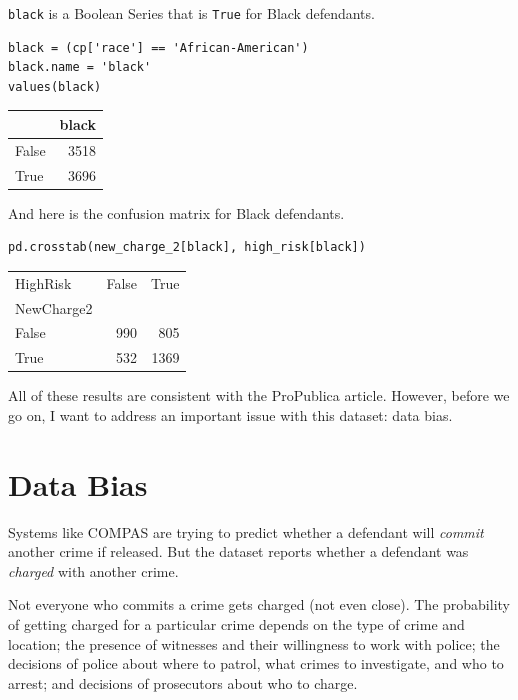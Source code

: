 \passthrough{\lstinline!black!} is a Boolean Series that is
\passthrough{\lstinline!True!} for Black defendants.

\begin{lstlisting}[]
black = (cp['race'] == 'African-American')
black.name = 'black'
values(black)
\end{lstlisting}

\begin{tabular}{lr}
\midrule
{} &  black \\
\midrule
False &   3518 \\
True  &   3696 \\
\midrule
\end{tabular}

And here is the confusion matrix for Black defendants.

\begin{lstlisting}[]
pd.crosstab(new_charge_2[black], high_risk[black])
\end{lstlisting}

\begin{tabular}{lrr}
\midrule
HighRisk &  False &  True \\
NewCharge2 &        &       \\
\midrule
False      &    990 &   805 \\
True       &    532 &  1369 \\
\midrule
\end{tabular}

All of these results are consistent with the ProPublica article.
However, before we go on, I want to address an important issue with this
dataset: data bias.

\hypertarget{data-bias}{%
\section{Data Bias}\label{data-bias}}

Systems like COMPAS are trying to predict whether a defendant will
\emph{commit} another crime if released. But the dataset reports whether
a defendant was \emph{charged} with another crime.

Not everyone who commits a crime gets charged (not even close). The
probability of getting charged for a particular crime depends on the
type of crime and location; the presence of witnesses and their
willingness to work with police; the decisions of police about where to
patrol, what crimes to investigate, and who to arrest; and decisions of
prosecutors about who to charge.

